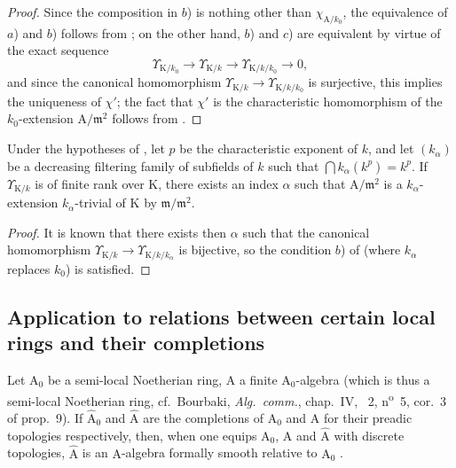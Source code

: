 \begin{proof}
Since the composition in $b$) is nothing other than $\chi_{\mathrm{A}/k_0}$, the equivalence of $a$) and $b$) follows from ; on the other hand, $b$) and $c$) are equivalent by virtue of the exact sequence 
\[
  \Upsilon_{\mathrm{K}/k_0}\to\Upsilon_{\mathrm{K}/k}\to\Upsilon_{\mathrm{K}/k/k_0}\to0,
\]
and since the canonical homomorphism $\Upsilon_{\mathrm{K}/k}\to\Upsilon_{\mathrm{K}/k/k_0}$ is surjective, this implies the uniqueness of $\chi'$; the fact that $\chi'$ is the characteristic homomorphism of the $k_0$-extension $\mathrm{A}/\mathfrak{m}^2$ follows from .
\end{proof}

\begin{corollary}[22.2.11]
\label{0.22.2.11}
Under the hypotheses of , let $p$ be the characteristic exponent of $k$, and let $(k_\alpha)$ be a decreasing filtering family of subfields of $k$ such that $\bigcap k_\alpha(k^p)=k^p$.
If $\Upsilon_{\mathrm{K}/k}$ is of finite rank over $\mathrm{K}$, there exists an index $\alpha$ such that $\mathrm{A}/\mathfrak{m}^2$ is a $k_\alpha$-extension $k_\alpha$-trivial of $\mathrm{K}$ by $\mathfrak{m}/\mathfrak{m}^2$.
\end{corollary}

\begin{proof}
It is known  that there exists then $\alpha$ such that the canonical homomorphism $\Upsilon_{\mathrm{K}/k}\to\Upsilon_{\mathrm{K}/k/k_\alpha}$ is bijective, so the condition $b$) of  (where $k_\alpha$ replaces $k_0$) is satisfied.
\end{proof}

\subsection{Application to relations between certain local rings and their completions}
\label{subsection:0.22.3}

\begin{lemma}[22.3.1]
\label{0.22.3.1}
Let $\mathrm{A}_0$ be a semi-local Noetherian ring, $\mathrm{A}$ a finite $\mathrm{A}_0$-algebra (which is thus a semi-local Noetherian ring, cf.~Bourbaki, \emph{Alg.~comm.}, chap.~IV, \textsection~2, n\textsuperscript{o}~5, cor.~3 of prop.~9).
If $\widehat{\mathrm{A}}_0$ and $\widehat{\mathrm{A}}$ are the completions of $\mathrm{A}_0$ and $\mathrm{A}$ for their preadic topologies respectively, then, when one equips $\mathrm{A}_0$, $\mathrm{A}$ and $\widehat{\mathrm{A}}$ with discrete topologies, $\widehat{\mathrm{A}}$ is an $\mathrm{A}$-algebra formally smooth relative to $\mathrm{A}_0$ .
\end{lemma}

